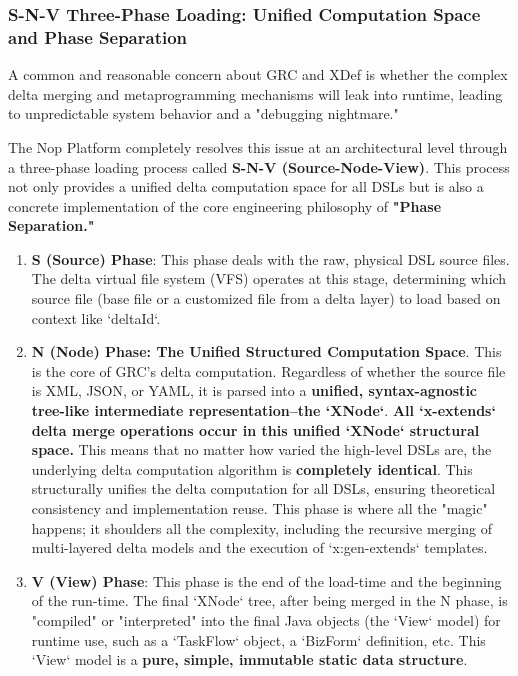\documentclass[11pt]{article}
\begin{document}
\subsubsection{S-N-V Three-Phase Loading: Unified Computation Space and Phase Separation}

A common and reasonable concern about GRC and XDef is whether the complex delta merging and metaprogramming mechanisms will leak into runtime, leading to unpredictable system behavior and a "debugging nightmare."

The Nop Platform completely resolves this issue at an architectural level through a three-phase loading process called \textbf{S-N-V (Source-Node-View)}. This process not only provides a unified delta computation space for all DSLs but is also a concrete implementation of the core engineering philosophy of \textbf{"Phase Separation."}

\begin{enumerate}
    \item \textbf{S (Source) Phase}: This phase deals with the raw, physical DSL source files. The delta virtual file system (VFS) operates at this stage, determining which source file (base file or a customized file from a delta layer) to load based on context like `deltaId`.
    \item \textbf{N (Node) Phase: The Unified Structured Computation Space}. This is the core of GRC's delta computation. Regardless of whether the source file is XML, JSON, or YAML, it is parsed into a \textbf{unified, syntax-agnostic tree-like intermediate representation--the `XNode`}. \textbf{All `x-extends` delta merge operations occur in this unified `XNode` structural space.} This means that no matter how varied the high-level DSLs are, the underlying delta computation algorithm is \textbf{completely identical}. This structurally unifies the delta computation for all DSLs, ensuring theoretical consistency and implementation reuse. This phase is where all the "magic" happens; it shoulders all the complexity, including the recursive merging of multi-layered delta models and the execution of `x:gen-extends` templates.
    \item \textbf{V (View) Phase}: This phase is the end of the load-time and the beginning of the run-time. The final `XNode` tree, after being merged in the N phase, is "compiled" or "interpreted" into the final Java objects (the `View` model) for runtime use, such as a `TaskFlow` object, a `BizForm` definition, etc. This `View` model is a \textbf{pure, simple, immutable static data structure}.
\end{enumerate}
\end{document}
